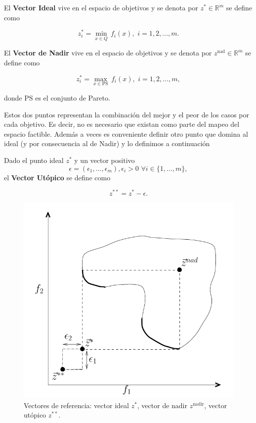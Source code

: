 \begin{definition} \label{def:Ideal}
    El \textbf{Vector Ideal} vive en el espacio de objetivos y se denota por $z^*\in \mathbb{R}^m$ se define como 
    
    $$z^*_i=\min_{x\in Q}\, f_i(x), \,\, i=1,2,\ldots,m .$$
\end{definition}

\begin{definition} \label{def:Nadir}
    El \textbf{Vector de Nadir} vive en el espacio de objetivos y se denota por $z^{\text{nad}}\in \mathbb{R}^m$ se define como 
    
    $$z^*_i=\max_{x\in \text{PS}}\, f_i(x), \,\, i=1,2,\ldots,m ,$$

    donde $\text{PS}$ es el conjunto de Pareto.
\end{definition}

Estos dos puntos representan la combinación del mejor y el peor de los casos por cada objetivo. Es decir, no es necesario que existan como parte del mapeo del espacio factible. Además a veces es conveniente definir  otro punto que domina al ideal (y por consecuencia al de Nadir) y lo definimos a continuación

\begin{definition} \label{def:utopico}
    Dado el punto ideal $z^*$ y un vector positivo $$\epsilon=(\epsilon_1,\ldots,\epsilon_m) , \epsilon_i>0 \,\, \forall i \in \{1,\ldots,m\},$$
    el \textbf{Vector Utópico} se define como 

    $$ z^{**}=z^*-\epsilon .$$
\end{definition}

\begin{figure}[H]
    \centering
    \includegraphics[scale=0.5]{Figuras/nadir_ideal_utopico.png}
    \caption{Vectores de referencia: vector ideal $z^*$, vector de nadir $z^{\text{nadir}}$, vector utópico $z^{**}$.}
    \label{fig:vectores_referencia}
\end{figure}

